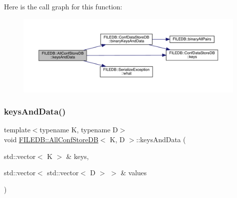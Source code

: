 Here is the call graph for this function\+:
\nopagebreak
\begin{figure}[H]
\begin{center}
\leavevmode
\includegraphics[width=350pt]{df/db6/classFILEDB_1_1AllConfStoreDB_a9150983c712d6b870a75886f92b10a9d_cgraph}
\end{center}
\end{figure}
\mbox{\label{classFILEDB_1_1AllConfStoreDB_a9150983c712d6b870a75886f92b10a9d}} 
\subsubsection{\texorpdfstring{keysAndData()}{keysAndData()}\hspace{0.1cm}{\footnotesize\ttfamily [3/3]}}
{\footnotesize\ttfamily template$<$typename K, typename D$>$ \\
void \mbox{\hyperlink{classFILEDB_1_1AllConfStoreDB}{F\+I\+L\+E\+D\+B\+::\+All\+Conf\+Store\+DB}}$<$ K, D $>$\+::keys\+And\+Data (\begin{DoxyParamCaption}\item[{std\+::vector$<$ K $>$ \&}]{keys,  }\item[{std\+::vector$<$ std\+::vector$<$ D $>$ $>$ \&}]{values }\end{DoxyParamCaption})\hspace{0.3cm}{\ttfamily [inline]}}

